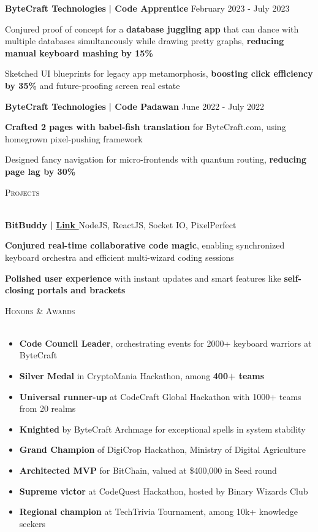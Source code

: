 \documentclass[a4paper,10pt]{article}
\newcommand{\lineunder} {
    \vspace*{-8pt} \\
    \hspace*{-18pt} \hrulefill \\
}
\newcommand{\header} [1] {
    \hspace*{-18pt}\vspace*{6pt} \textsc{#1}
    \vspace*{-6pt} \lineunder
    \vspace{1mm}
}
\newcommand{\employer}[5]{
    \textbf{#1}\textbf{ | #2} \hfill  {#3} - {#4}\\
    \vspace{1mm}
    \begin{itemize}[leftmargin=0.7cm, itemsep=-2pt, topsep=0pt]{#5}\end{itemize}
}
\newcommand{\project}[4]{
    {\textbf{#1}}\textbf{ | \href{#2}{\underline{Link \faLink}}}\hfill{ #3}\\
    \vspace{1mm}
    \begin{itemize}[leftmargin=0.7cm, itemsep=0pt, topsep=0pt]
    {#4}
    \end{itemize}
}
\begin{document}
\employer{ByteCraft Technologies}{Code Apprentice}{February 2023}{July 2023}{
\item Conjured proof of concept for a \textbf{database juggling app} that can dance with multiple databases simultaneously while drawing pretty graphs, \textbf{reducing manual keyboard mashing by 15\%}
\item Sketched UI blueprints for legacy app metamorphosis, \textbf{boosting click efficiency by 35\%} and future-proofing screen real estate
}

\employer{ByteCraft Technologies}{Code Padawan}{June 2022}{July 2022}{
\item \textbf{Crafted 2 pages with babel-fish translation} for ByteCraft.com, using homegrown pixel-pushing framework
\item Designed fancy navigation for micro-frontends with quantum routing, \textbf{reducing page lag by 30\%}
}

\header{Projects}
\project{BitBuddy}{https://github.com/byte-master/bitbuddy}{NodeJS, ReactJS, Socket IO, PixelPerfect}{
\item \textbf{Conjured real-time collaborative code magic}, enabling synchronized keyboard orchestra and efficient multi-wizard coding sessions
\item \textbf{Polished user experience} with instant updates and smart features like \textbf{self-closing portals and brackets}
}

\header{Honors \& Awards}
\begin{itemize}[leftmargin=*, itemsep=-1pt, topsep=0pt]
\item \textbf{Code Council Leader}, orchestrating events for 2000+ keyboard warriors at ByteCraft
\item \textbf{Silver Medal} in CryptoMania Hackathon, among \textbf{400+ teams}
\item \textbf{Universal runner-up} at CodeCraft Global Hackathon with 1000+ teams from 20 realms
\item \textbf{Knighted} by ByteCraft Archmage for exceptional spells in system stability
\item \textbf{Grand Champion} of DigiCrop Hackathon, Ministry of Digital Agriculture
\item \textbf{Architected MVP} for BitChain, valued at \$400,000 in Seed round
\item \textbf{Supreme victor} at CodeQuest Hackathon, hosted by Binary Wizards Club
\item \textbf{Regional champion} at TechTrivia Tournament, among 10k+ knowledge seekers
\end{itemize}
\end{document}
